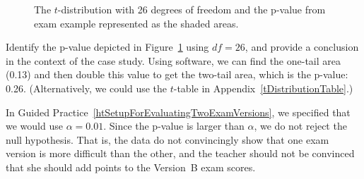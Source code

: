 \D{\newpage}

\begin{figure}[h]
  \centering
  \caption{The $t$-distribution with 26 degrees of freedom
      and the p-value from exam example represented
      as the shaded areas.}
  \label{pValueOfTwoTailAreaOfExamVersionsWhereDFIs26}
\end{figure}

\begin{examplewrap}
\begin{nexample}{Identify the p-value depicted in
    Figure~\ref{pValueOfTwoTailAreaOfExamVersionsWhereDFIs26}
    using $df = 26$, and provide a conclusion in the
    context of the case study.}
  Using software, we can find the one-tail area (0.13)
  and then double this value to get the two-tail area,
  which is the p-value: 0.26.
  (Alternatively, we could use the $t$-table in
  Appendix~\ref{tDistributionTable}.)

  In Guided
  Practice~\ref{htSetupForEvaluatingTwoExamVersions},
  we specified that we would use $\alpha = 0.01$.
  Since the p-value is larger than $\alpha$,
  we do not reject the null hypothesis.
  That is, the data do not convincingly show that one exam
  version is more difficult than the other, and the teacher
  should not be convinced that she should add points to the
  Version~B exam scores.
\end{nexample}
\end{examplewrap}


